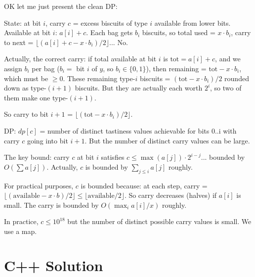 \documentclass[11pt,a4paper]{article}
\begin{document}
OK let me just present the clean DP:

State: at bit $i$, carry $c$ = excess biscuits of type $i$ available from lower bits. Available at bit $i$: $a[i] + c$. Each bag gets $b_i$ biscuits, so total used = $x \cdot b_i$, carry to next = $\lfloor (a[i] + c - x \cdot b_i) / 2 \rfloor$... No.

Actually, the correct carry: if total available at bit $i$ is $\text{tot} = a[i] + c$, and we assign $b_i$ per bag ($b_i = $ bit $i$ of $y$, so $b_i \in \{0, 1\}$), then remaining = $\text{tot} - x \cdot b_i$, which must be $\ge 0$. These remaining type-$i$ biscuits = $(\text{tot} - x \cdot b_i) / 2$ rounded down as type-$(i+1)$ biscuits. But they are actually each worth $2^i$, so two of them make one type-$(i+1)$.

So carry to bit $i+1$ = $\lfloor(\text{tot} - x \cdot b_i) / 2\rfloor$.

DP: $dp[c]$ = number of distinct tastiness values achievable for bits 0..i with carry $c$ going into bit $i+1$. But the number of distinct carry values can be large.

The key bound: carry $c$ at bit $i$ satisfies $c \le \max(a[j]) \cdot 2^{i-j}$... bounded by $O(\sum a[j])$. Actually, $c$ is bounded by $\sum_{j \le i} a[j]$ roughly.

For practical purposes, $c$ is bounded because: at each step, carry = $\lfloor(\text{available} - x \cdot b) / 2\rfloor \le \lfloor \text{available} / 2 \rfloor$. So carry decreases (halves) if $a[i]$ is small. The carry is bounded by $O(\max_i a[i] / x)$ roughly.

In practice, $c \le 10^{18}$ but the number of distinct possible carry values is small. We use a map.

\section{C++ Solution}
\end{document}
